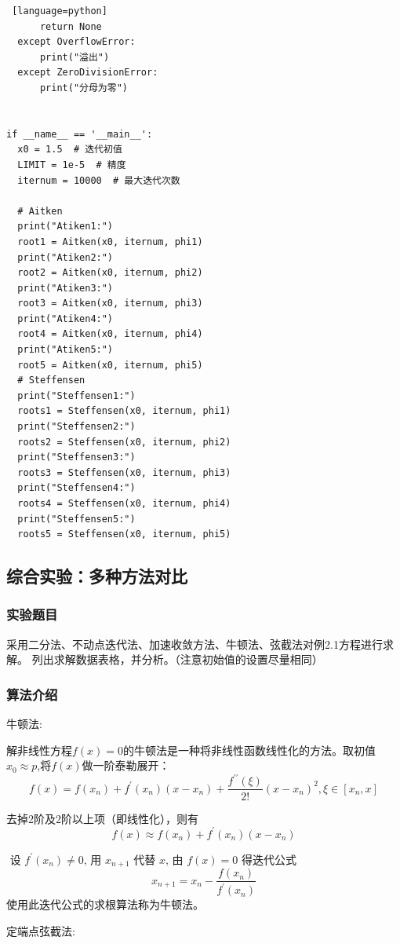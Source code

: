 \documentclass[UTF8]{ctexart}
\begin{document}
\begin{lstlisting} [language=python]
      return None
  except OverflowError:
      print("溢出")
  except ZeroDivisionError:
      print("分母为零")


if __name__ == '__main__':
  x0 = 1.5  # 迭代初值
  LIMIT = 1e-5  # 精度
  iternum = 10000  # 最大迭代次数

  # Aitken
  print("Atiken1:")
  root1 = Aitken(x0, iternum, phi1)
  print("Atiken2:")
  root2 = Aitken(x0, iternum, phi2)
  print("Atiken3:")
  root3 = Aitken(x0, iternum, phi3)
  print("Atiken4:")
  root4 = Aitken(x0, iternum, phi4)
  print("Atiken5:")
  root5 = Aitken(x0, iternum, phi5)
  # Steffensen
  print("Steffensen1:")
  roots1 = Steffensen(x0, iternum, phi1)
  print("Steffensen2:")
  roots2 = Steffensen(x0, iternum, phi2)
  print("Steffensen3:")
  roots3 = Steffensen(x0, iternum, phi3)
  print("Steffensen4:")
  roots4 = Steffensen(x0, iternum, phi4)
  print("Steffensen5:")
  roots5 = Steffensen(x0, iternum, phi5)
\end{lstlisting}

\subsection{综合实验：多种方法对比}
\subsubsection{实验题目}
采用二分法、不动点迭代法、加速收敛方法、牛顿法、弦截法对例2.1方程进行求解。
列出求解数据表格，并分析。（注意初始值的设置尽量相同）
\subsubsection{算法介绍}
牛顿法:

解非线性方程$f(x) = 0$的牛顿法是一种将非线性函数线性化的方法。取初值
$x_0\approx p$,将$f(x)$做一阶泰勒展开：
$$
f(x)=f\left(x_{n}\right)+f^{\prime}\left(x_{n}\right)\left(x-x_{n}\right)+\frac{f^{\prime \prime}(\xi)}{2 !}\left(x-x_{n}\right)^{2}, \xi \in\left[x_{n}, x\right]
$$

去掉2阶及2阶以上项（即线性化），则有
$$
f(x) \approx f\left(x_{n}\right)+f^{\prime}\left(x_{n}\right)\left(x-x_{n}\right)
$$

$\text { 设 } f^{\prime}\left(x_{n}\right) \neq 0 \text {, 用 } x_{n+1} \text { 代替 } x \text {, 由 } f(x)=0 \text { 得迭代公式 }$
$$
x_{n+1}=x_{n}-\frac{f\left(x_{n}\right)}{f^{\prime}\left(x_{n}\right)}
$$
使用此迭代公式的求根算法称为牛顿法。

\quad

定端点弦截法:
\end{document}
